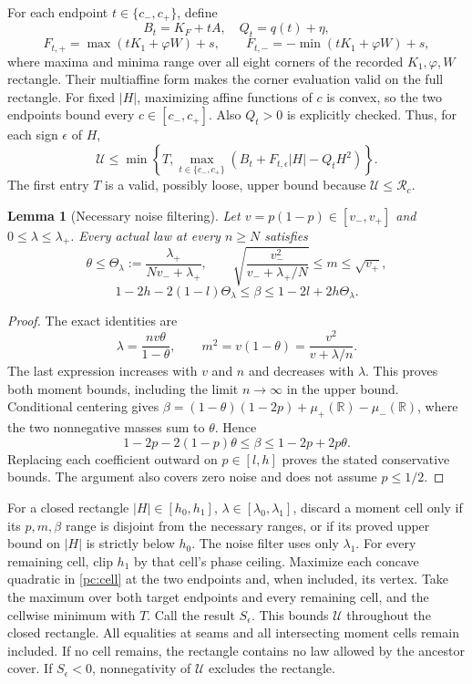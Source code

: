 \documentclass[11pt]{article}
\newtheorem{lemma}{Lemma}\newtheorem{proposition}{Proposition}
\begin{document}
For each endpoint $t\in\{c_-,c_+\}$, define
\[
 B_t=K_F+tA,\quad Q_t=q(t)+\eta,
\]
\[
 F_{t,+}=\max(tK_1+\varphi W)+s,\qquad
 F_{t,-}=-\min(tK_1+\varphi W)+s,
\]
where maxima and minima range over all eight corners of the recorded
$K_1,\varphi,W$ rectangle. Their multiaffine form makes the corner
evaluation valid on the full rectangle. For fixed $|H|$, maximizing
affine functions of $c$ is convex, so the two endpoints bound every
$c\in[c_-,c_+]$. Also $Q_t>0$ is explicitly checked.
Thus, for each sign $\epsilon$ of $H$,
\begin{equation}\label{pc:cell}
 \mathcal U\le
 \min\left\{T,\max_{t\in\{c_-,c_+\}}
             (B_t+F_{t,\epsilon}|H|-Q_tH^2)\right\}.
\end{equation}
The first entry $T$ is a valid, possibly loose, upper bound because
$\mathcal U\le\mathcal R_c$.

\begin{lemma}[Necessary noise filtering]\label{pc:noise}
Let $v=p(1-p)\in[v_-,v_+]$ and $0\le\lambda\le\lambda_+$.
Every actual law at every $n\ge N$ satisfies
\[
 \theta\le\Theta_\lambda:=\frac{\lambda_+}{Nv_-+\lambda_+},\qquad
 \sqrt{\frac{v_-^2}{v_-+\lambda_+/N}}\le m\le\sqrt{v_+},
\]
\[
 1-2h-2(1-l)\Theta_\lambda\le\beta
       \le1-2l+2h\Theta_\lambda.
\]
\end{lemma}
\begin{proof}
The exact identities are
\[
 \lambda=\frac{nv\theta}{1-\theta},\qquad
 m^2=v(1-\theta)=\frac{v^2}{v+\lambda/n}.
\]
The last expression increases with $v$ and $n$ and decreases with
$\lambda$. This proves both moment bounds, including the limit
$n\longrightarrow\infty$ in the upper bound. Conditional centering gives
$\beta=(1-\theta)(1-2p)+\mu_+(\mathbb R)-\mu_-(\mathbb R)$,
where the two nonnegative masses sum to $\theta$. Hence
\[
 1-2p-2(1-p)\theta\le\beta\le1-2p+2p\theta.
\]
Replacing each coefficient outward on $p\in[l,h]$ proves the stated
conservative bounds. The argument also covers zero noise and does not
assume $p\le1/2$.
\end{proof}

For a closed rectangle
$|H|\in[h_0,h_1]$, $\lambda\in[\lambda_0,\lambda_1]$, discard a moment
cell only if its $p,m,\beta$ range is disjoint from the necessary ranges,
or if its proved upper bound on $|H|$ is strictly below $h_0$.
The noise filter uses only $\lambda_1$. For every remaining cell, clip
$h_1$ by that cell's phase ceiling. Maximize each concave quadratic in
\eqref{pc:cell} at the two endpoints and, when included, its vertex.
Take the maximum over both target endpoints and every remaining cell,
and the cellwise minimum with $T$. Call the result $S_\epsilon$.
This bounds $\mathcal U$ throughout the closed rectangle. All equalities
at seams and all intersecting moment cells remain included. If no cell
remains, the rectangle contains no law allowed by the ancestor cover.
If $S_\epsilon<0$, nonnegativity of $\mathcal U$ excludes the rectangle.
\end{document}
